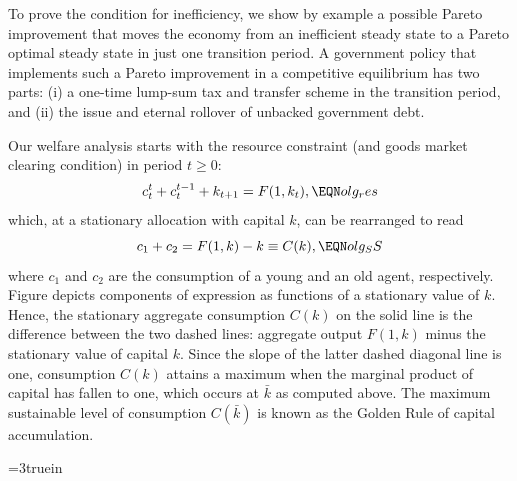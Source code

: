 To prove the condition for inefficiency, we show
by example a possible Pareto improvement that moves the 
economy from an inefficient steady state to a Pareto 
optimal steady state in just one transition period. 
A government policy that implements such a Pareto
improvement in a competitive equilibrium has two
parts: (i) a one-time lump-sum tax and transfer scheme 
in the transition period, and (ii) the issue and eternal 
rollover of unbacked government debt.

Our welfare analysis starts with the resource constraint 
(and goods market clearing condition) in period $t\geq 0$:
$$ c^t_t + c^{t-1}_t + k_{t+1} = F(1,k_t),      \EQN olg_res $$
which, at a stationary allocation with capital $k$, can be
rearranged to read 
$$ c_1 + c_2   = F(1,k) - k 
                           \equiv C(k),   \EQN olg_SS $$
where $c_1$ and $c_2$ are the consumption of a young and 
an old agent, respectively. Figure 
depicts components of expression  as functions
of a stationary value of $k$. Hence, the stationary
aggregate consumption $C(k)$ on the solid line is the
difference between the two dashed lines:
aggregate output $F(1,k)$ minus the stationary
value of capital $k$. Since the slope of the latter
dashed diagonal line is one, consumption $C(k)$ attains
a maximum when the marginal product of capital has fallen
to one, which occurs at $\bar k$ as computed above.
The maximum sustainable level of consumption $C(\bar k)$ 
is known as the Golden Rule of capital 
accumulation.

\centerline{\epsfxsize=3truein}
\caption{Output $F(1,k)$ and aggregate consumption $C(k)$
as functions of a stationary capital value $k$. The 
Golden-Rule level of capital is $\bar k$, i.e., 
$C'(\bar k)=0$, and $k^\star$ is an example of
a dynamically inefficient steady state.}
\endfigure


